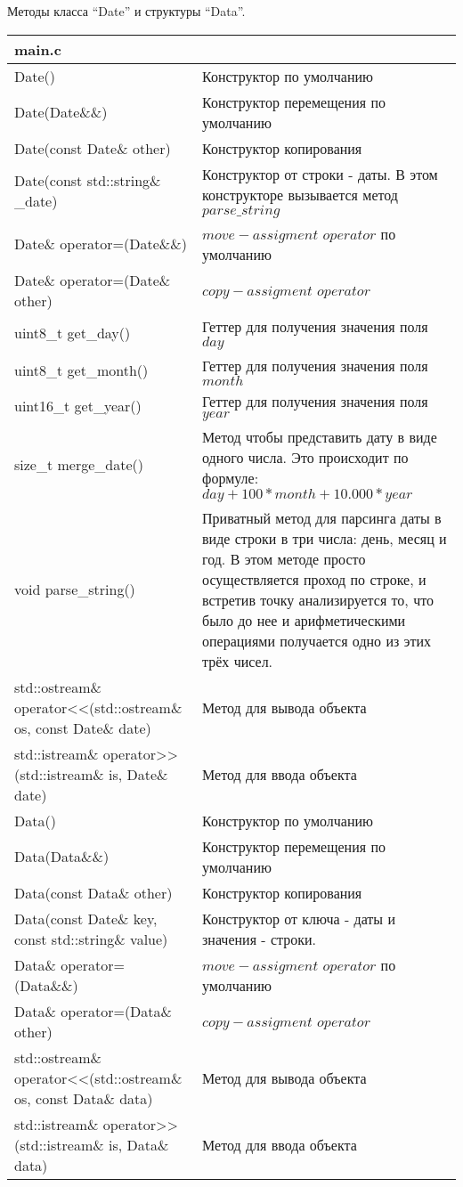 Методы класса \enquote{Date} и структуры \enquote{Data}.
\begin{longtable}{|p{7.5cm}|p{7.5cm}|}
\hline
\rowcolor{lightgray}
\multicolumn{2}{|c|} {main.c}\\
\hline
Date()&Конструктор по умолчанию\\
\hline
Date(Date\&\&)&Конструктор перемещения по умолчанию\\
\hline
Date(const Date\& other)&Конструктор копирования\\
\hline
Date(const std::string\& \_date)&Конструктор от строки - даты. В этом конструкторе вызывается метод $parse\_string$\\
\hline
Date\& operator=(Date\&\&)&$move-assigment$ $operator$ по умолчанию\\
\hline
Date\& operator=(Date\& other)&$copy-assigment$ $operator$\\
\hline
uint8\_t get\_day()&Геттер для получения значения поля $day$\\
\hline
uint8\_t get\_month()&Геттер для получения значения поля $month$\\
\hline
uint16\_t get\_year()&Геттер для получения значения поля $year$\\
\hline
size\_t merge\_date()&Метод чтобы представить дату в виде одного числа. Это происходит по формуле: $day + 100 * month + 10.000 * year$\\
\hline
void parse\_string()&Приватный метод для парсинга даты в виде строки в три числа: день, месяц и год. В этом методе просто осуществляется проход по строке, и встретив точку анализируется то, что было до нее и арифметическими операциями получается одно из этих трёх чисел.\\
\hline
std::ostream\& operator<<(std::ostream\& os, const Date\& date)&Метод для вывода объекта\\
\hline
std::istream\& operator>>(std::istream\& is, Date\& date)&Метод для ввода объекта\\
\hline
Data()&Конструктор по умолчанию\\
\hline
Data(Data\&\&)&Конструктор перемещения по умолчанию\\
\hline
Data(const Data\& other)&Конструктор копирования\\
\hline
Data(const Date\& key, const std::string\& value)&Конструктор от ключа - даты и значения - строки.\\
\hline
Data\& operator=(Data\&\&)&$move-assigment$ $operator$ по умолчанию\\
\hline
Data\& operator=(Data\& other)&$copy-assigment$ $operator$\\
\hline
std::ostream\& operator<<(std::ostream\& os, const Data\& data)&Метод для вывода объекта\\
\hline
std::istream\& operator>>(std::istream\& is, Data\& data)&Метод для ввода объекта\\
\hline
\end{longtable}
